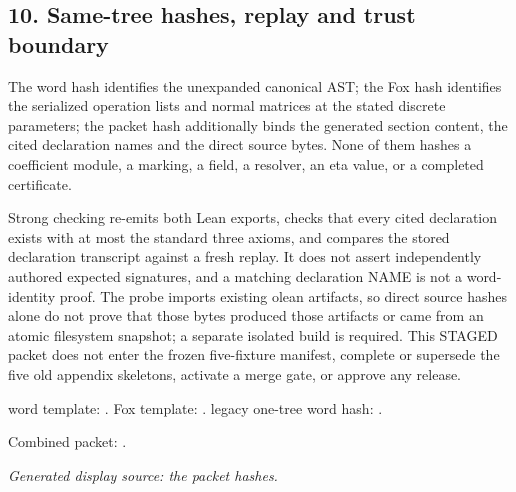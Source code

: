 \subsection*{10. Same-tree hashes, replay and trust boundary}
The word hash identifies the unexpanded canonical AST; the Fox hash identifies the serialized operation lists and normal matrices at the stated discrete parameters; the packet hash additionally binds the generated section content, the cited declaration names and the direct source bytes. None of them hashes a coefficient module, a marking, a field, a resolver, an eta value, or a completed certificate.

Strong checking re-emits both Lean exports, checks that every cited declaration exists with at most the standard three axioms, and compares the stored declaration transcript against a fresh replay. It does not assert independently authored expected signatures, and a matching declaration NAME is not a word-identity proof. The probe imports existing olean artifacts, so direct source hashes alone do not prove that those bytes produced those artifacts or came from an atomic filesystem snapshot; a separate isolated build is required. This STAGED packet does not enter the frozen five-fixture manifest, complete or supersede the five old appendix skeletons, activate a merge gate, or approve any release.

word template: .
Fox template: .
legacy one-tree word hash: .
\par Combined packet: .
\par\noindent\emph{Generated display source: the packet hashes.}
